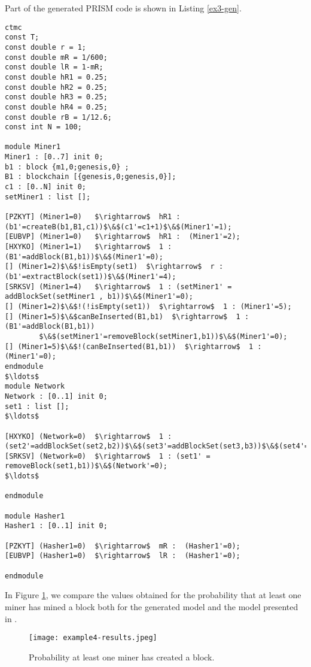 Part of the generated PRISM code is shown in Listing \ref{ex3-gen}. 
\begin{lstlisting}[style=prism-color,caption={Generated PRISM program for the Peer-To-Peer Protocol.},captionpos=b,label={ex3-gen}]
ctmc
const T;
const double r = 1;
const double mR = 1/600;
const double lR = 1-mR;
const double hR1 = 0.25;
const double hR2 = 0.25;
const double hR3 = 0.25;
const double hR4 = 0.25;
const double rB = 1/12.6;
const int N = 100;

module Miner1
Miner1 : [0..7] init 0;
b1 : block {m1,0;genesis,0} ; 
B1 : blockchain [{genesis,0;genesis,0}]; 
c1 : [0..N] init 0; 
setMiner1 : list []; 

[PZKYT] (Miner1=0)   $\rightarrow$  hR1 : (b1'=createB(b1,B1,c1))$\&$(c1'=c1+1)$\&$(Miner1'=1); 
[EUBVP] (Miner1=0)   $\rightarrow$  hR1 :  (Miner1'=2); 
[HXYKO] (Miner1=1)   $\rightarrow$  1 : (B1'=addBlock(B1,b1))$\&$(Miner1'=0); 
[] (Miner1=2)$\&$!isEmpty(set1)  $\rightarrow$  r : (b1'=extractBlock(set1))$\&$(Miner1'=4); 
[SRKSV] (Miner1=4)   $\rightarrow$  1 : (setMiner1' = addBlockSet(setMiner1 , b1))$\&$(Miner1'=0); 
[] (Miner1=2)$\&$!(!isEmpty(set1))  $\rightarrow$  1 : (Miner1'=5); 
[] (Miner1=5)$\&$canBeInserted(B1,b1)  $\rightarrow$  1 : (B1'=addBlock(B1,b1))
		$\&$(setMiner1'=removeBlock(setMiner1,b1))$\&$(Miner1'=0); 
[] (Miner1=5)$\&$!(canBeInserted(B1,b1))  $\rightarrow$  1 : (Miner1'=0);
endmodule
$\ldots$
module Network
Network : [0..1] init 0;
set1 : list []; 
$\ldots$

[HXYKO] (Network=0)  $\rightarrow$  1 : (set2'=addBlockSet(set2,b2))$\&$(set3'=addBlockSet(set3,b3))$\&$(set4'=addBlockSet(set4,b4))$\&$(Network'=0); 
[SRKSV] (Network=0)  $\rightarrow$  1 : (set1' = removeBlock(set1,b1))$\&$(Network'=0); 
$\ldots$

endmodule

module Hasher1
Hasher1 : [0..1] init 0;

[PZKYT] (Hasher1=0)  $\rightarrow$  mR :  (Hasher1'=0); 
[EUBVP] (Hasher1=0)  $\rightarrow$  lR :  (Hasher1'=0); 

endmodule
\end{lstlisting}


In Figure \ref{ex3-res}, we compare the values obtained for the probability that at least one miner has mined a block both for the generated model and the model presented in \cite{DBLP:journals/concurrency/BistarelliNGLMV23}.
\begin{figure}[h]
\centering
\texttt{[image: example4-results.jpeg]}	
\caption{Probability at least one miner has created a block.}
\label{ex3-res}
\end{figure}


